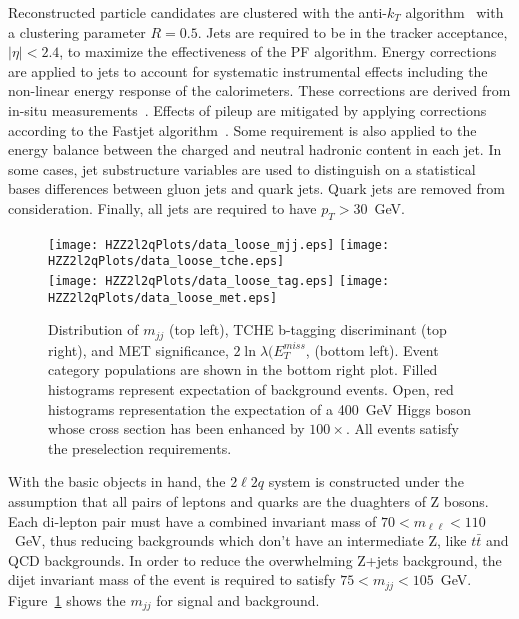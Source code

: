 Reconstructed particle candidates are clustered with the
anti-$k_T$ algorithm~\cite{Cacciari:2008gp,Cacciari:2011ma} with a clustering parameter $R=0.5$.
Jets are required to be in the tracker acceptance, $|\eta|<2.4$,
to maximize the effectiveness of the PF algorithm.  Energy
corrections  are applied to jets to account for systematic
instrumental effects including the non-linear energy response
of the calorimeters.  These corrections are derived from in-situ
measurements~\cite{Chatrchyan:2011ds}.  Effects of pileup
are mitigated by applying corrections according to the Fastjet
algorithm~\cite{Cacciari:2008gn}.  Some requirement is also applied to the
energy balance between the charged and neutral hadronic 
content in each jet.  In some cases, jet substructure variables are used
to distinguish on a statistical bases differences between gluon jets and
quark jets. Quark jets are removed from consideration.  Finally, all jets are required to have $p_T>30$~GeV.

\begin{figure}
\begin{center}
\texttt{[image: HZZ2l2qPlots/data\_loose\_mjj.eps]}
\texttt{[image: HZZ2l2qPlots/data\_loose\_tche.eps]}\\
\texttt{[image: HZZ2l2qPlots/data\_loose\_tag.eps]}
\texttt{[image: HZZ2l2qPlots/data\_loose\_met.eps]}
\caption{Distribution of $m_{jj}$ (top left), TCHE b-tagging
discriminant (top right), and MET significance, $2\ln\lambda(E^{miss}_{T}$, (bottom left).  Event category populations are shown 
in the bottom right plot.  Filled histograms represent expectation
of background events.  Open, red histograms representation the 
expectation of a 400~GeV Higgs boson whose cross section has been
enhanced by $100\times$.  All events satisfy the preselection
requirements. }
\label{fig:HZZ2l2qPreselectiOnly}
\end{center}
\end{figure}

With the basic objects in hand, the $2\ell2q$ system is
constructed under the assumption that all pairs of leptons
and quarks are the duaghters of Z bosons.  Each di-lepton
pair must have a combined invariant mass of 
$70 < m_{\ell\ell} < 110$~GeV, thus reducing backgrounds which
don't have an intermediate Z, like $t\bar{t}$ and QCD backgrounds.
In order to reduce the overwhelming Z+jets background, the dijet
invariant mass of the event is required to satisfy
$75 < m_{jj} < 105$~GeV.  
Figure~\ref{fig:HZZ2l2qPreselectiOnly} shows the $m_{jj}$ for
signal and background. 

